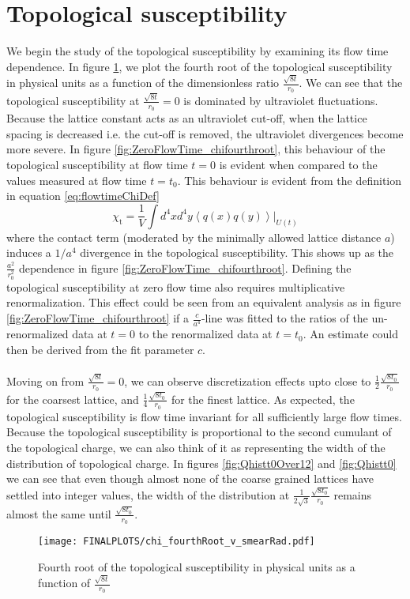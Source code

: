 \documentclass[a4paper,10pt]{book}
\begin{document}
\section{Topological susceptibility}
We begin the study of the topological susceptibility by examining its flow time dependence. In figure \ref{fig:FlowTime_v_smearRad}, we plot the fourth root of the topological susceptibility in physical units as a function of the dimensionless ratio $\frac{\sqrt{8t}}{r_0}$. We can see that the topological susceptibility at $\frac{\sqrt{8t}}{r_0}=0$ is dominated by ultraviolet fluctuations. Because the lattice constant acts as an ultraviolet cut-off, when the lattice spacing is decreased i.e. the cut-off is removed, the ultraviolet divergences become more severe. In figure \ref{fig:ZeroFlowTime_chifourthroot}, this behaviour of the topological susceptibility at flow time $t=0$ is evident when compared to the values measured at flow time $t=t_0$. This behaviour is evident from the definition in equation \eqref{eq:flowtimeChiDef}
\begin{equation}\label{eq:flowtimeChiDef}
\chi_{\mathrm{t}}=\frac{1}{V} \int d^{4} x d^{4} y\left\langle q(x) q(y)\right\rangle\big|_{U(t)}
\end{equation}
where the contact term (moderated by the minimally allowed lattice distance $a$) induces a $1/a^4$ divergence in the topological susceptibility. This shows up as the $\frac{a^2}{r_0^2}$ dependence in figure \ref{fig:ZeroFlowTime_chifourthroot}. Defining the topological susceptibility at zero flow time also requires multiplicative renormalization. This effect could be seen from an equivalent analysis as in figure \ref{fig:ZeroFlowTime_chifourthroot} if a $\frac{c}{a^4}$-line was fitted to the ratios of the un-renormalized data at $t=0$ to the renormalized data at $t=t_0$. An estimate could then be derived from the fit parameter $c$.\\\\Moving on from $\frac{\sqrt{8t}}{r_0}=0$, we can observe discretization effects upto close to $\frac{1}{2}\frac{\sqrt{8t_0}}{r_0}$ for the coarsest lattice, and $\frac{1}{4}\frac{\sqrt{8t_0}}{r_0}$ for the finest lattice. As expected, the topological susceptibility is flow time invariant for all sufficiently large flow times. Because the topological susceptibility is proportional to the second cumulant of the topological charge, we can also think of it as representing the width of the distribution of topological charge. In figures \ref{fig:Qhistt0Over12} and \ref{fig:Qhistt0} we can see that even though almost none of the coarse grained lattices have settled into integer values, the width of the distribution at $\frac{1}{2\sqrt{3}}\frac{\sqrt{8t_0}}{r_0}$ remains almost the same until $\frac{\sqrt{8t_0}}{r_0}$.
\begin{figure}[htbp]
\centering
\texttt{[image: FINALPLOTS/chi\_fourthRoot\_v\_smearRad.pdf]}
\caption[]{Fourth root of the topological susceptibility in physical units as a function of $\frac{\sqrt{8t}}{r_0}$}\label{fig:FlowTime_v_smearRad}
\end{figure}
\end{document}
